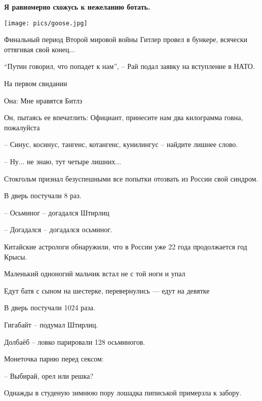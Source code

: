 \textbf{\LARGE Я равномерно схожусь к нежеланию ботать.}

\texttt{[image: pics/goose.jpg]}

Финальный период Второй мировой войны Гитлер провел в бункере, всячески оттягивая свой конец...

\bigbreak

``Путин говорил, что попадет к нам'', -- Рай подал заявку на вступление в НАТО.

\bigbreak

На первом свидании

Она: Мне нравятся Битлз

Он, пытаясь ее впечатлить: Официант, принесите нам два килограмма говна, пожалуйста

\bigbreak

-- Синус, косинус, тангенс, котангенс, кунилингус -- найдите лишнее слово.

-- Ну... не знаю, тут четыре лишних...

\bigbreak

Стокгольм признал безуспешными все попытки отозвать из России свой синдром.

\bigbreak

В дверь постучали 8 раз.

-- Осьминог -- догадался Штирлиц

-- Догадался -- догадался осьминог.

\bigbreak

Китайские астрологи обнаружили, что в России уже 22 года продолжается год Крысы.

\bigbreak

Маленький одноногий мальчик встал не с той ноги и упал

\bigbreak

Едут батя с сыном на шестерке, перевернулись --- едут на девятке

\bigbreak

В дверь постучали 1024 раза. 

Гигабайт -- подумал Штирлиц. 

Долбаёб -- ловко парировали 128 осьминогов.

\bigbreak

Монеточка парню перед сексом:

-- Выбирай, орел или решка?

\bigbreak

Однажды в студеную зимнюю пору лошадка пиписькой примерзла к забору.


